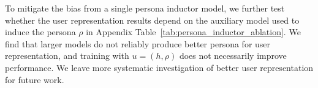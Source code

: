 \documentclass[11pt]{article}
\newcommand{\llq}[1]{{\color{cyan}[linlu: #1]}}
\begin{document}
To mitigate the bias from a single persona inductor model, we further test whether the user representation results depend on the auxiliary model used to induce the persona $\rho$ in Appendix Table~\ref{tab:persona_inductor_ablation}. We find that larger models do not reliably produce better persona for user representation, and training with $u=(h, \rho)$ does not necessarily improve performance. We leave more systematic investigation of better user representation for future work.




\end{document}
